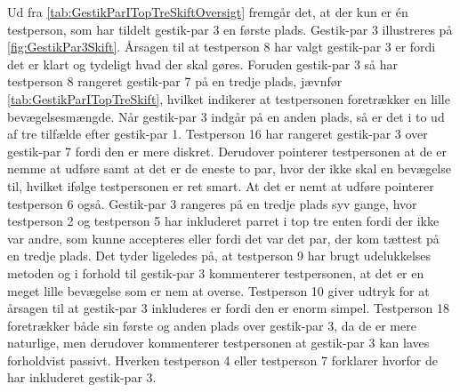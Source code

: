 Ud fra \autoref{tab:GestikParITopTreSkiftOversigt} fremgår det, at der kun er én testperson, som har tildelt gestik-par 3 en første plads. Gestik-par 3 illustreres på \autoref{fig:GestikPar3Skift}. Årsagen til at testperson 8 har valgt gestik-par 3 er fordi det er klart og tydeligt hvad der skal gøres. Foruden gestik-par 3 så har testperson 8 rangeret gestik-par 7 på en tredje plads, jævnfør \autoref{tab:GestikParITopTreSkift}, hvilket indikerer at testpersonen foretrækker en lille bevægelsesmængde. Når gestik-par 3 indgår på en anden plads, så er det i to ud af tre tilfælde efter gestik-par 1. Testperson 16 har rangeret gestik-par 3 over gestik-par 7 fordi den er mere diskret. Derudover pointerer testpersonen at de er nemme at udføre samt at det er de eneste to par, hvor der ikke skal en bevægelse til, hvilket ifølge testpersonen er ret smart. At det er nemt at udføre pointerer testperson 6 også. Gestik-par 3 rangeres på en tredje plads syv gange, hvor testperson 2 og testperson 5 har inkluderet parret i top tre enten fordi der ikke var andre, som kunne accepteres eller fordi det var det par, der kom tættest på en tredje plads. Det tyder ligeledes på, at testperson 9 har brugt udelukkelses metoden og i forhold til gestik-par 3 kommenterer testpersonen, at det er en meget lille bevægelse som er nem at overse. Testperson 10 giver udtryk for at årsagen til at gestik-par 3 inkluderes er fordi den er enorm simpel. Testperson 18 foretrækker både sin første og anden plads over gestik-par 3, da de er mere naturlige, men derudover kommenterer testpersonen at gestik-par 3 kan laves forholdvist passivt. Hverken testperson 4 eller testperson 7 forklarer hvorfor de har inkluderet gestik-par 3. 

